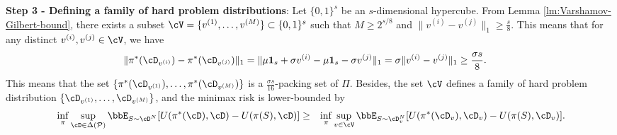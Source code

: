     \textbf{Step 3 - Defining a family of hard problem distributions}: Let $\{0, 1\}^s$ be an $s$-dimensional hypercube. From Lemma \ref{lm:Varshamov-Gilbert-bound}, there exists a subset $\cV = \{v^{(1)}, \dots, v^{(M)}\} \subset \{0, 1\}^s$ such that $M \geq 2^{s/8}$ and $\|v^{(i)} - v^{(j)}\|_1 \geq \frac{s}{8}$. This means that for any distinct $v^{(i)}, v^{(j)} \in \cV$, we have
    \begin{equation*}
        \begin{aligned}
            \|\pi^*(\cD_{v^{(i)}}) - \pi^*(\cD_{v^{(j)}})\|_1 &= \|\mu \mathbf{1}_s + \sigma v^{(i)} - \mu \mathbf{1}_s - \sigma v^{(j)}\|_1 = \sigma \|v^{(i)} - v^{(j)} \|_1 \geq \frac{\sigma s}{8}.
        \end{aligned}
    \end{equation*}
    This means that the set $\{\pi^*(\cD_{v^{(1)}}), \dots, \pi^*(\cD_{v^{(M)}})\}$ is a $\frac{\sigma s}{16}$-packing set of $\Pi$. Besides, the set $\cV$ defines a family of hard problem distribution $\{\cD_{v^{(1)}}, \dots, \cD_{v^{(M)}}\}$, and the minimax risk is lower-bounded by
    \begin{equation*}
        \begin{aligned}
            &\inf_{\pi}\sup_{\cD \in \Delta(\mathcal{P})} \bbE_{S \sim \cD^N}[U(\pi^*(\cD), \cD) - U(\pi(S), \cD)] 
            \geq &\inf_{\pi} \sup_{v \in \cV} \bbE_{S \sim \cD_v^N}[U(\pi^*(\cD_v), \cD_v) - U(\pi(S), \cD_v)].
        \end{aligned}
    \end{equation*}



